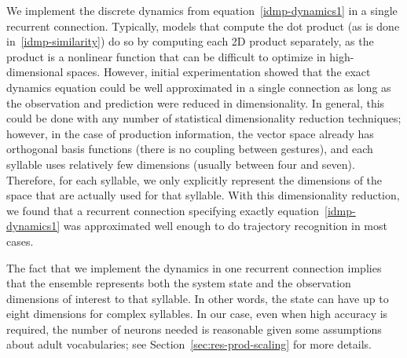 We implement the discrete dynamics
from equation~\eqref{idmp-dynamics1}
in a single recurrent connection.
Typically,
models that compute the dot product
(as is done in~\eqref{idmp-similarity})
do so by computing each 2D product separately,
as the product is a nonlinear function
that can be difficult to optimize
in high-dimensional spaces.
However, initial experimentation
showed that the exact dynamics equation
could be well approximated
in a single connection
as long as the observation
and prediction were reduced in dimensionality.
In general, this could be done
with any number of statistical dimensionality
reduction techniques;
however, in the case of production information,
the vector space already has
orthogonal basis functions
(there is no coupling between gestures),
and each syllable uses
relatively few dimensions
(usually between four and seven).
Therefore, for each syllable,
we only explicitly represent
the dimensions of the space
that are actually used for that syllable.
With this dimensionality reduction,
we found that a recurrent connection
specifying exactly equation~\eqref{idmp-dynamics1}
was approximated well enough
to do trajectory recognition in most cases.

The fact that we implement the dynamics
in one recurrent connection
implies that the ensemble
represents both the system state
and the observation dimensions
of interest to that syllable.
In other words, the state can have
up to eight dimensions for complex syllables.
In our case,
even when high accuracy is required,
the number of neurons needed
is reasonable given some assumptions
about adult vocabularies;
see Section~\ref{sec:res-prod-scaling}
for more details.


